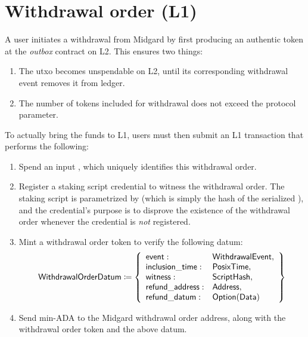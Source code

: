 \documentclass[../midgard.tex]{subfiles}
\begin{document}
\section{Withdrawal order (L1)}
\label{h:withdrawal-order}

A user initiates a withdrawal from Midgard by first producing an authentic token at the \emph{outbox} contract on L2.
This ensures two things:
\begin{enumerate}
    \item The utxo becomes unspendable on L2, until its corresponding withdrawal event removes it from ledger.
    \item The number of tokens included for withdrawal does not exceed the  protocol parameter.
\end{enumerate}

To actually bring the funds to L1, users must then submit an L1 transaction that performs the following:
\begin{enumerate}
    \item Spend an input , which uniquely identifies this withdrawal order.
    \item Register a staking script credential to witness the withdrawal order.
      The staking script is parametrized by  (which is simply the hash of the serialized ), and the credential's purpose is to disprove the existence of the withdrawal order whenever the credential is \emph{not} registered.
    \item Mint a withdrawal order token to verify the following datum:
        \begin{equation*}
        \mathsf{WithdrawalOrderDatum} \coloneq \left\{
            \begin{array}{ll}
                \mathsf{event} : & \mathsf{WithdrawalEvent}, \\
                \mathsf{inclusion\_time} : & \mathsf{PosixTime}, \\
                \mathsf{witness} : & \mathsf{ScriptHash}, \\
                \mathsf{refund\_address}: & \mathsf{Address}, \\
                \mathsf{refund\_datum}: & \mathsf{Option(Data)}
            \end{array}
            \right\}
        \end{equation*}
    \item Send min-ADA to the Midgard withdrawal order address, along with the withdrawal order token and the above datum.
\end{enumerate}
\end{document}
